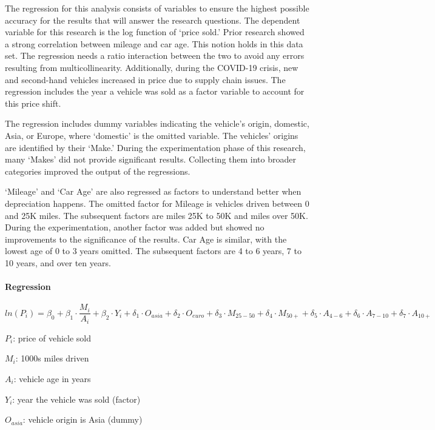 \documentclass{article}
\begin{document}
The regression for this analysis consists of variables to ensure the
highest possible accuracy for the results that will answer the research
questions. The dependent variable for this research is the log function
of `price sold.' Prior research showed a strong correlation between
mileage and car age. This notion holds in this data set. The regression
needs a ratio interaction between the two to avoid any errors resulting
from multicollinearity. Additionally, during the COVID-19 crisis, new
and second-hand vehicles increased in price due to supply chain issues.
The regression includes the year a vehicle was sold as a factor variable
to account for this price shift.

The regression includes dummy variables indicating the vehicle's origin,
domestic, Asia, or Europe, where `domestic' is the omitted variable. The
vehicles' origins are identified by their `Make.' During the
experimentation phase of this research, many `Makes' did not provide
significant results. Collecting them into broader categories improved
the output of the regressions.

`Mileage' and `Car Age' are also regressed as factors to understand
better when depreciation happens. The omitted factor for Mileage is
vehicles driven between 0 and 25K miles. The subsequent factors are
miles 25K to 50K and miles over 50K. During the experimentation, another
factor was added but showed no improvements to the significance of the
results. Car Age is similar, with the lowest age of 0 to 3 years
omitted. The subsequent factors are 4 to 6 years, 7 to 10 years, and
over ten years.

\hypertarget{regression}{%
\paragraph{Regression}\label{regression}}

\[
ln(P_{i})= \beta_{0} + \beta_{1} \cdot  {\frac {M_{i}} {A_{i}}} + \beta_{2} \cdot
Y_{i} + \delta_{1} \cdot O_{asia} + \delta_{2} \cdot O_{euro} + \delta_{3} \cdot M_{25-50}
+ \delta_{4} \cdot M_{50+} + \delta_{5} \cdot A_{4-6} + \delta_{6} \cdot A_{7-10}
+ \delta_{7} \cdot A_{10+}
\]

\(P_{i}\): price of vehicle sold

\(M_{i}\): 1000s miles driven

\(A_{i}\): vehicle age in years

\(Y_{i}\): year the vehicle was sold (factor)

\(O_{asia}\): vehicle origin is Asia (dummy)
\end{document}
